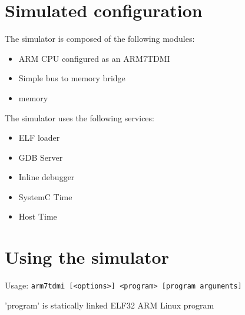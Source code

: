 \section{Simulated configuration}

The simulator is composed of the following modules:
\begin{itemize}\addtolength{\itemsep}{-0.40\baselineskip}
\item ARM CPU configured as an ARM7TDMI
\item Simple bus to memory bridge
\item memory
\end{itemize}

The simulator uses the following services:
\begin{itemize}\addtolength{\itemsep}{-0.40\baselineskip}
\item ELF loader
\item GDB Server
\item Inline debugger
\item SystemC Time
\item Host Time
\end{itemize}

\section{Using the simulator}

Usage: \texttt{arm7tdmi [<options>] <program> [program arguments]}

     'program' is statically linked ELF32 ARM Linux program

